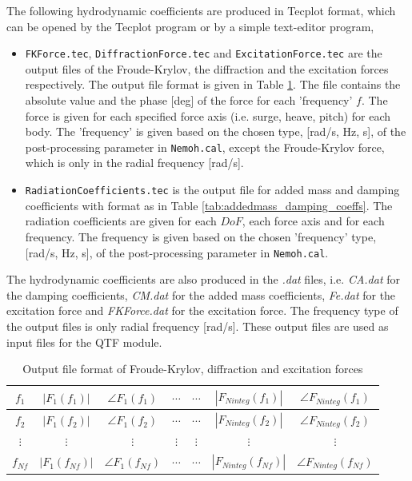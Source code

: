 \documentclass[12pt,a4paper,titlepage]{article}
\begin{document}
The following hydrodynamic coefficients are produced in Tecplot format, which can be opened by the Tecplot program or by a simple text-editor program,
\begin{itemize}
\item \texttt{FKForce.tec}, \texttt{DiffractionForce.tec} and \texttt{ExcitationForce.tec} are the output files of the Froude-Krylov, the diffraction and the excitation forces respectively. The output file format is given in Table \ref{tab:WaveForce}. The file contains the absolute value and the phase [deg] of the force for each 'frequency' $f$. The force is given for each specified force axis (i.e. surge, heave, pitch) for each body. The 'frequency' is given based on the chosen type, [rad/s, Hz, s], of the post-processing parameter in \texttt{Nemoh.cal}, except the Froude-Krylov force, which is only in the radial frequency [rad/s]. 
\item \texttt{RadiationCoefficients.tec} is the output file for added mass and damping coefficients with format as in Table \ref{tab:addedmass_damping_coeffs}. The radiation coefficients are given for each $DoF$, each force axis and for each frequency. The frequency is given based on the chosen 'frequency' type, [rad/s, Hz, s], of the post-processing parameter in \texttt{Nemoh.cal}. 
\end{itemize}
The hydrodynamic coefficients are also produced in the \textit{.dat} files, i.e. \textit{CA.dat} for the damping coefficients, \textit{CM.dat} for the added mass coefficients, \textit{Fe.dat} for the excitation force and \textit{FKForce.dat} for the excitation force. The frequency type of the output files is only radial frequency [rad/s]. These output files are used as input files for the QTF module. \\

\begin{table}[ht]
\begin{center}
\caption{Output file format of Froude-Krylov, diffraction and excitation forces}\label{tab:WaveForce}
\begin{tabular}{ccccccc}
\hline
$f_1$ & $|F_1(f_1)|$ & $\angle F_1(f_1)$ &$\cdots$ &$\cdots$&$|F_{Ninteg}(f_1)|$ & $\angle F_{Ninteg}(f_1)$ \\
\hline
$f_2$ &  $|F_1(f_2)|$ & $\angle F_1(f_2)$ &$\cdots$ &$\cdots$&$|F_{Ninteg}(f_2)|$ & $\angle F_{Ninteg}(f_2)$ \\
\hline
$\vdots$ & $\vdots$ & $\vdots$ & $\vdots$ & $\vdots$ & $\vdots$ & $\vdots$ \\
\hline
$f_{Nf}$ &  $|F_1(f_{Nf})|$ & $\angle F_1(f_{Nf})$ &$\cdots$ &$\cdots$&$|F_{Ninteg}(f_{Nf})|$ & $\angle F_{Ninteg}(f_{Nf})$ \\
\hline
\end{tabular}
\end{center}
\end{table}
\end{document}
